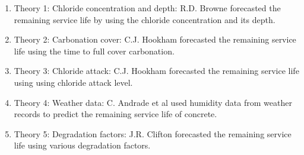 \documentclass[12pt, titlepage]{article}
\begin{document}
\begin{enumerate}
    \item Theory 1: Chloride concentration and depth: 
    \label{item:browne}
    R.D. Browne \cite{browne} forecasted the remaining service life by using the chloride concentration and its depth.

    \item Theory 2: Carbonation cover:
    \label{item:hookham}
    C.J. Hookham\cite{hookham} forecasted the remaining service life using the time to full cover carbonation.
    
    \item Theory 3: Chloride attack:
    \label{item:hookham}
    C.J. Hookham\cite{hookham} forecasted the remaining service life using using chloride attack level.
    
    \item Theory 4: Weather data:
    \label{item:weather}
     C. Andrade et al \cite{andrade} used humidity data from weather records to predict the remaining service life of concrete.

    \item Theory 5: Degradation factors:
    \label{item:failure}
    J.R. Clifton \cite{clifton} forecasted the remaining service life using various degradation factors.
\end{enumerate}
\end{document}
